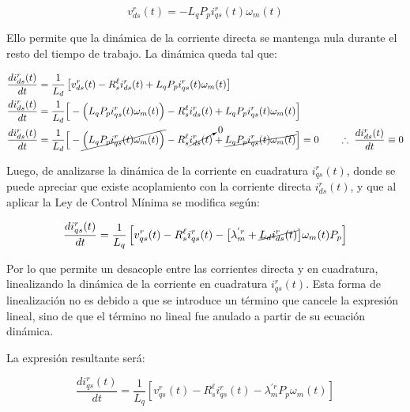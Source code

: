 \documentclass[blue,fullpaper]{ludusofficial}  %
\begin{document}
\begin{enumerate}
    \begin{equation}
        v_{ds}^{r}(t)  = -L_{q}P_{p} i_{qs}^{r}(t) \omega_{m}(t)
    \end{equation}
    
    Ello permite que la dinámica de la corriente directa se mantenga nula durante el resto del tiempo de trabajo. La dinámica queda tal que:

    \begin{align*}
        \frac{di_{ds}^{r}(t)}{dt} & = \frac{1}{L_{d}} \left[v_{ds}^{r}(t) - R_{s}^{\ell} i_{ds}^{r}(t) + L_{q}P_{p} i_{qs}^{r}(t) \omega_{m}(t) \right]
        \\
        \frac{di_{ds}^{r}(t)}{dt} & = \frac{1}{L_{d}} \Big[ - \Big(  L_{q}P_{p} i_{qs}^{r}(t) \omega_{m}(t) \Big) - R_{s}^{\ell} i_{ds}^{r}(t) + L_{q}P_{p} i_{qs}^{r}(t) \omega_{m}(t) \Big]
        \\
        \frac{di_{ds}^{r}(t)}{dt} & = \frac{1}{L_{d}} \Big[ - \cancel{ \Big(  L_{q}P_{p} i_{qs}^{r}(t) \omega_{m}(t) \Big) } - R_{s}^{\ell} \cancelto{ 0 }{  i_{ds}^{r}(t) } + \cancel{ L_{q}P_{p} i_{qs}^{r}(t) \omega_{m}(t)  }\Big] = 0 \qquad \therefore \; \frac{di_{ds}^{r}(t)}{dt} \equiv 0
    \end{align*}
    
    Luego, de analizarse la dinámica de la corriente en cuadratura $i_{qs}^{r}(t)$, donde se puede apreciar que existe acoplamiento con la corriente directa $i_{ds}^{r}(t)$, y que al aplicar la Ley de Control Mínima se modifica según:

    \begin{equation*}
        \frac{di_{qs}^{r}(t)}{dt} = \frac{1}{L_{q} } \left[ v_{qs}^{r}(t) - R_{s}^{\ell} i_{qs}^{r}(t) - \big[ \lambda_{m}^{'r} +\cancel{  L_{d} i_{ds}^{r}(t) } \big] \omega_{m}(t)P_{p} \right]
    \end{equation*}

    Por lo que permite un desacople entre las corrientes directa y en cuadratura, linealizando la dinámica de la corriente en cuadratura $i_{qs}^{r}(t)$. Esta forma de linealización no es debido a que se introduce un término que cancele la expresión lineal, sino de que el término no lineal fue anulado a partir de su ecuación dinámica.
    
    La expresión resultante será:

    \begin{equation*}
        \frac{di_{qs}^{r}(t)}{dt} = \frac{1}{L_{q} } \left[ v_{qs}^{r}(t) - R_{s}^{\ell} i_{qs}^{r}(t) -\lambda_{m}^{'r} P_{p} \omega_{m}(t) \right]
    \end{equation*}


\end{enumerate}
\end{document}

